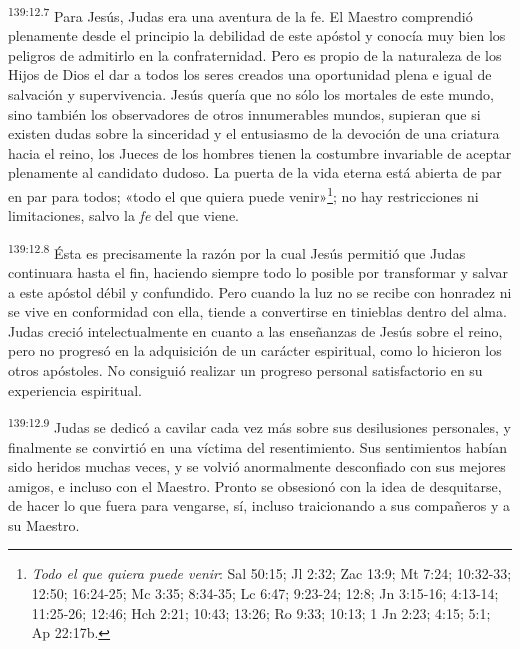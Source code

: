 \par
\textsuperscript{139:12.7} Para Jesús, Judas era una aventura de la fe. El Maestro comprendió plenamente desde el principio la debilidad de este apóstol y conocía muy bien los peligros de admitirlo en la confraternidad. Pero es propio de la naturaleza de los Hijos de Dios el dar a todos los seres creados una oportunidad plena e igual de salvación y supervivencia. Jesús quería que no sólo los mortales de este mundo, sino también los observadores de otros innumerables mundos, supieran que si existen dudas sobre la sinceridad y el entusiasmo de la devoción de una criatura hacia el reino, los Jueces de los hombres tienen la costumbre invariable de aceptar plenamente al candidato dudoso. La puerta de la vida eterna está abierta de par en par para todos; «todo el que quiera puede venir»\footnote{\textit{Todo el que quiera puede venir}: Sal 50:15; Jl 2:32; Zac 13:9; Mt 7:24; 10:32-33; 12:50; 16:24-25; Mc 3:35; 8:34-35; Lc 6:47; 9:23-24; 12:8; Jn 3:15-16; 4:13-14; 11:25-26; 12:46; Hch 2:21; 10:43; 13:26; Ro 9:33; 10:13; 1 Jn 2:23; 4:15; 5:1; Ap 22:17b.}; no hay restricciones ni limitaciones, salvo la \textit{fe} del que viene.

\par
\textsuperscript{139:12.8} Ésta es precisamente la razón por la cual Jesús permitió que Judas continuara hasta el fin, haciendo siempre todo lo posible por transformar y salvar a este apóstol débil y confundido. Pero cuando la luz no se recibe con honradez ni se vive en conformidad con ella, tiende a convertirse en tinieblas dentro del alma. Judas creció intelectualmente en cuanto a las enseñanzas de Jesús sobre el reino, pero no progresó en la adquisición de un carácter espiritual, como lo hicieron los otros apóstoles. No consiguió realizar un progreso personal satisfactorio en su experiencia espiritual.

\par
\textsuperscript{139:12.9} Judas se dedicó a cavilar cada vez más sobre sus desilusiones personales, y finalmente se convirtió en una víctima del resentimiento. Sus sentimientos habían sido heridos muchas veces, y se volvió anormalmente desconfiado con sus mejores amigos, e incluso con el Maestro. Pronto se obsesionó con la idea de desquitarse, de hacer lo que fuera para vengarse, sí, incluso traicionando a sus compañeros y a su Maestro.

